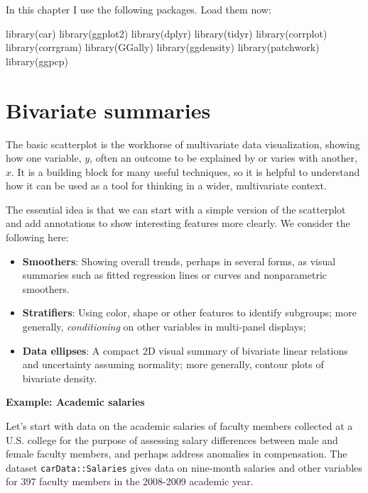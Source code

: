 \documentclass[
  letterpaper,
  10pt,
  krantz2]{krantz}
\makeatletter
\newenvironment{Shaded}{\begin{snugshade}}{\end{snugshade}}
\newcommand{\FunctionTok}[1]{\textcolor[rgb]{0.28,0.35,0.67}{#1}}
\newcommand{\NormalTok}[1]{\textcolor[rgb]{0.00,0.23,0.31}{#1}}
\providecommand{\tightlist}{%
  \setlength{\itemsep}{0pt}\setlength{\parskip}{0pt}}\usepackage{longtable,booktabs,array}
\newenvironment{kframe}{%
  \medskip{}
  \setlength{\fboxsep}{.8em}
  \def\at@end@of@kframe{}%
  \ifinner\ifhmode%
  \def\at@end@of@kframe{\end{minipage}}%
  \begin{minipage}{\columnwidth}%
  \fi\fi%
  \def\FrameCommand##1{\hskip\@totalleftmargin \hskip-\fboxsep
  \colorbox{shadecolor}{##1}\hskip-\fboxsep
      \hskip-\linewidth \hskip-\@totalleftmargin \hskip\columnwidth}%
  \MakeFramed {\advance\hsize-\width
    \@totalleftmargin\z@ \linewidth\hsize
    \@setminipage}}%
{\par\unskip\endMakeFramed%
  \at@end@of@kframe}
\renewenvironment{Shaded}{\begin{kframe}}{\end{kframe}}
\makeatother
\begin{document}
In this chapter I use the following packages. Load them now:

\begin{Shaded}
\begin{Highlighting}[]
\FunctionTok{library}\NormalTok{(car)}
\FunctionTok{library}\NormalTok{(ggplot2)}
\FunctionTok{library}\NormalTok{(dplyr)}
\FunctionTok{library}\NormalTok{(tidyr)}
\FunctionTok{library}\NormalTok{(corrplot)}
\FunctionTok{library}\NormalTok{(corrgram)}
\FunctionTok{library}\NormalTok{(GGally)}
\FunctionTok{library}\NormalTok{(ggdensity)}
\FunctionTok{library}\NormalTok{(patchwork)}
\FunctionTok{library}\NormalTok{(ggpcp)}
\end{Highlighting}
\end{Shaded}

\hypertarget{sec-bivariate_summaries}{%
\section{Bivariate summaries}\label{sec-bivariate_summaries}}

The basic scatterplot is the workhorse of multivariate data
visualization, showing how one variable, \(y\), often an outcome to be
explained by or varies with another, \(x\). It is a building block for
many useful techniques, so it is helpful to understand how it can be
used as a tool for thinking in a wider, multivariate context.

The essential idea is that we can start with a simple version of the
scatterplot and add annotations to show interesting features more
clearly. We consider the following here:

\begin{itemize}
\tightlist
\item
  \textbf{Smoothers}: Showing overall trends, perhaps in several forms,
  as visual summaries such as fitted regression lines or curves and
  nonparametric smoothers.
\item
  \textbf{Stratifiers}: Using color, shape or other features to identify
  subgroups; more generally, \emph{conditioning} on other variables in
  multi-panel displays;
\item
  \textbf{Data ellipses}: A compact 2D visual summary of bivariate
  linear relations and uncertainty assuming normality; more generally,
  contour plots of bivariate density.
\end{itemize}

\textbf{Example: Academic salaries}

Let's start with data on the academic salaries of faculty members
collected at a U.S. college for the purpose of assessing salary
differences between male and female faculty members, and perhaps address
anomalies in compensation. The dataset \texttt{carData::Salaries} gives
data on nine-month salaries and other variables for 397 faculty members
in the 2008-2009 academic year.
\end{document}
